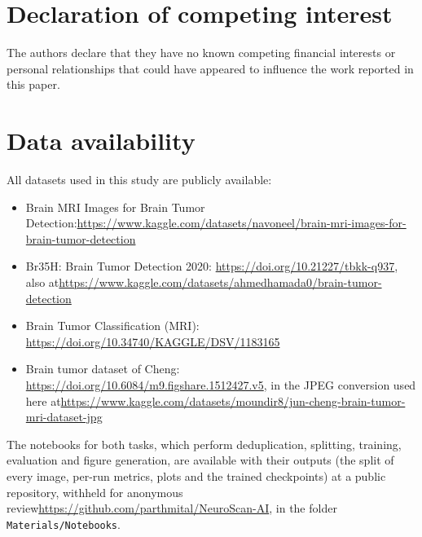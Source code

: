 \documentclass[a4paper,fleqn]{cas-sc}
\begin{document}
\section*{Declaration of competing interest}

The authors declare that they have no known competing financial interests or personal relationships that could have appeared to influence the work reported in this paper.

\section*{Data availability}

All datasets used in this study are publicly available:
\begin{itemize}
\item Brain MRI Images for Brain Tumor Detection:\newline \url{https://www.kaggle.com/datasets/navoneel/brain-mri-images-for-brain-tumor-detection}
\item Br35H: Brain Tumor Detection 2020: \url{https://doi.org/10.21227/tbkk-q937}, also at\newline \url{https://www.kaggle.com/datasets/ahmedhamada0/brain-tumor-detection}
\item Brain Tumor Classification (MRI): \url{https://doi.org/10.34740/KAGGLE/DSV/1183165}
\item Brain tumor dataset of Cheng: \url{https://doi.org/10.6084/m9.figshare.1512427.v5}, in the JPEG conversion used here at\newline \url{https://www.kaggle.com/datasets/moundir8/jun-cheng-brain-tumor-mri-dataset-jpg}
\end{itemize}
The notebooks for both tasks, which perform deduplication, splitting, training, evaluation and figure generation, are available with their outputs (the split of every image, per-run metrics, plots and the trained checkpoints) at \ifdefined\Anonymised a public repository, withheld for anonymous review\else\url{https://github.com/parthmital/NeuroScan-AI}, in the folder \texttt{Materials/Notebooks}\fi.


\ifdefined\NoReferences
\renewenvironment{thebibliography}[1]{\setbox0=\vbox\bgroup\list{}{}}{\endlist\egroup}
\fi

\end{document}
